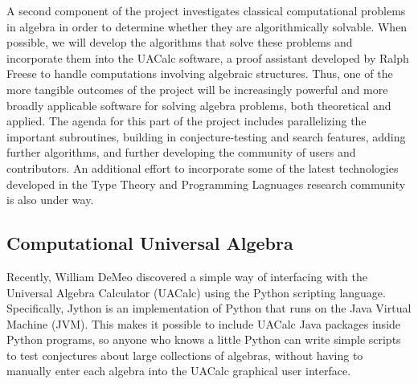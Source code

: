 \begin{thebibliography}{1}
A second component of the project investigates classical computational problems
in algebra in order to determine whether they are algorithmically solvable.
When possible, we will develop the algorithms that solve these problems and 
incorporate them into the UACalc software, a proof assistant developed
by Ralph Freese to handle computations involving algebraic structures. 
Thus, one of the more tangible outcomes of the project will be
increasingly powerful and more broadly applicable software for solving
algebra problems, both theoretical and applied.
The agenda for this part of the project includes parallelizing the important subroutines,
building in conjecture-testing and search features, adding further algorithms,
and further developing the community of users and contributors. An additional
effort to incorporate some of the latest technologies developed in the Type
Theory and Programming Lagnuages research community is also under way.



\vskip2cm


















\subsection*{Computational Universal Algebra}

Recently, William DeMeo discovered a simple way of interfacing with the
Universal Algebra Calculator (UACalc) using the Python scripting language.
Specifically, Jython is an implementation of Python that runs on the Java Virtual
Machine (JVM). This makes it possible to include UACalc Java packages
inside Python programs, so anyone who knows a little Python can write simple
scripts to test conjectures about large collections of
algebras, without having to manually enter each algebra into the UACalc
graphical user interface. 


\end{thebibliography}
